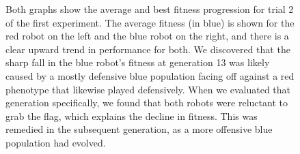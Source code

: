\documentclass[11pt]{article}
\begin{document}
\begin{figure}[h]
\begin{center}
\end{center}
\caption{Both graphs show the average and best fitness progression for trial 2 of the first experiment. The average fitness (in blue) is shown for the red robot on the left and the blue robot on the right, and there is a clear upward trend in performance for both. We discovered that the sharp fall in the blue robot's fitness at generation 13 was likely caused by a mostly defensive blue population facing off against a red phenotype that likewise played defensively. When we evaluated that generation specifically, we found that both robots were reluctant to grab the flag, which explains the decline in fitness. This was remedied in the subsequent generation, as a more offensive blue population had evolved.}
\label{experiment1fitness}
\end{figure}
\end{document}
